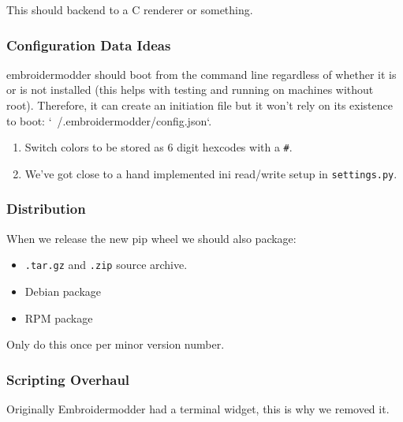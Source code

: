 \documentclass[a4paper, 11pt]{report}
\begin{document}
This should backend to a C renderer or something.

\subsubsection{Configuration Data Ideas}

embroidermodder should boot from the command line
regardless of whether it is or is not installed (this helps with testing and
running on machines without root). Therefore, it can create an initiation file
but it won't rely on its existence to boot: `~/.embroidermodder/config.json`.

\begin{enumerate}
\item Switch colors to be stored as 6 digit hexcodes with a \texttt{\#}.
\item We've got close to a hand implemented ini read/write setup in \texttt{settings.py}.
\end{enumerate}

\subsubsection{Distribution}

When we release the new pip wheel we should also package:

\begin{itemize}
\item \texttt{.tar.gz} and \texttt{.zip} source archive.
\item Debian package
\item RPM package
\end{itemize}

Only do this once per minor version number.

\subsubsection{Scripting Overhaul}

Originally Embroidermodder had a terminal widget, this is why we removed it.
\end{document}
